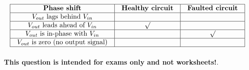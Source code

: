 $$\vbox{\offinterlineskip
\halign{\strut
\vrule \quad\hfil # \ \hfil & 
\vrule \quad\hfil # \ \hfil & 
\vrule \quad\hfil # \ \hfil \vrule \cr
\noalign{\hrule}
%
{\bf Phase shift} & {\bf Healthy circuit} & {\bf Faulted circuit} \cr
%
\noalign{\hrule}
%
$V_{out}$ lags behind $V_{in}$ &  &  \cr
%
\noalign{\hrule}
%
$V_{out}$ leads ahead of $V_{in}$ & $\surd$ &  \cr
%
\noalign{\hrule}
%
$V_{out}$ is in-phase with $V_{in}$ &  & $\surd$ \cr
%
\noalign{\hrule}
%
$V_{out}$ is zero (no output signal) &  &  \cr
%
\noalign{\hrule}
} %
}$$ %








{\bf This question is intended for exams only and not worksheets!}.



